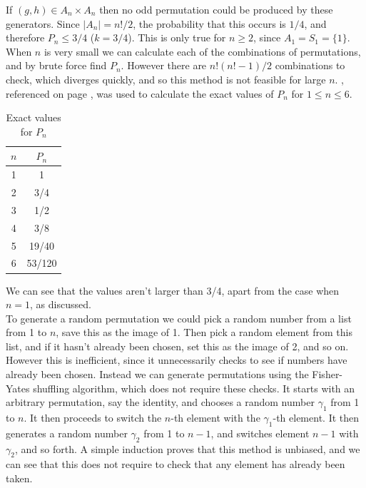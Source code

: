 \documentclass[10pt,a4paper,notitlepage]{article}
\newcommand{\abs}[1]{\lvert#1\rvert}
\begin{document}
If $(g,h)\in A_{n}\times A_{n}$ then no odd permutation could be produced by these generators. Since $\abs{A_{n}}=n!/2$, the probability that this occurs is $1/4$, and therefore $P_{n}\leq 3/4$ ($k=3/4$). This is only true for $n\geq 2$, since $A_{1}=S_{1}=\lbrace 1\rbrace$. \\

When $n$ is very small we can calculate each of the combinations of permutations, and by brute force find $P_{n}$. However there are $n!(n!-1)/2$ combinations to check, which diverges quickly, and so this method is not feasible for large $n$. , referenced on page \pageref{cd:9.1}, was used to calculate the exact values of $P_{n}$ for $1\leq n\leq 6$. 
\begin{table}[H]
\centering
\begin{tabular}{|c|c|}
\hline $n$ & $P_{n}$ \\
\hline 1 & 1\\
2 & 3/4\\
3 & 1/2\\
4 & 3/8\\
5 & 19/40\\
6 & 53/120\\
\hline
\end{tabular}
\caption{Exact values for $P_{n}$}\label{tb:Exact P_n}
\end{table}

We can see that the values aren't larger than 3/4, apart from the case when $n=1$, as discussed. \\

To generate a random permutation we could pick a random number from a list from 1 to $n$, save this as the image of 1. Then pick a random element from this list, and if it hasn't already been chosen, set this as the image of 2, and so on. However this is inefficient, since it unnecessarily checks to see if numbers have already been chosen. Instead we can generate permutations using the Fisher-Yates shuffling algorithm, which does not require these checks. It starts with an arbitrary permutation, say the identity, and chooses a random number $\gamma_{1}$ from 1 to $n$. It then proceeds to switch the $n$-th element with the $\gamma_{1}$-th element. It then generates a random number $\gamma_{2}$ from 1 to $n-1$, and switches element $n-1$ with $\gamma_{2}$, and so forth. A simple induction proves that this method is unbiased, and we can see that this does not require to check that any element has already been taken. 
\end{document}
